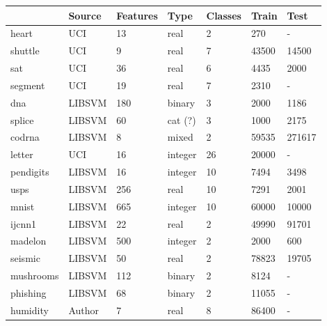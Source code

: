 \begin{tabular}{|l|llllll|}
	\hline
	& Source & Features & Type & Classes & Train & Test \\\hline
	heart & UCI & 13 & real & 2 & 270 & - \\
	shuttle & UCI & 9 & real & 7 & 43500 & 14500 \\
	sat & UCI & 36 & real & 6 & 4435 & 2000 \\
	segment & UCI & 19 & real & 7 & 2310 & - \\
	dna & LIBSVM & 180 & binary & 3 & 2000 & 1186 \\
	splice & LIBSVM & 60 & cat (?) & 3 & 1000 & 2175 \\
	codrna & LIBSVM & 8 & mixed & 2 & 59535 & 271617 \\
	letter & UCI & 16 & integer & 26 & 20000 & - \\
	pendigits & LIBSVM & 16 & integer & 10 & 7494 & 3498 \\
	usps & LIBSVM & 256 & real & 10 & 7291 & 2001 \\
	mnist & LIBSVM & 665 & integer & 10 & 60000 & 10000 \\
	ijcnn1 & LIBSVM & 22 & real & 2 & 49990 & 91701 \\
	madelon & LIBSVM & 500 & integer & 2 & 2000 & 600 \\
	seismic & LIBSVM & 50 & real & 2 & 78823 & 19705 \\
	mushrooms & LIBSVM & 112 & binary & 2 & 8124 & - \\
	phishing & LIBSVM & 68 & binary & 2 & 11055 & - \\
	humidity & Author & 7 & real & 8 & 86400 & - \\
	\hline
\end{tabular}

